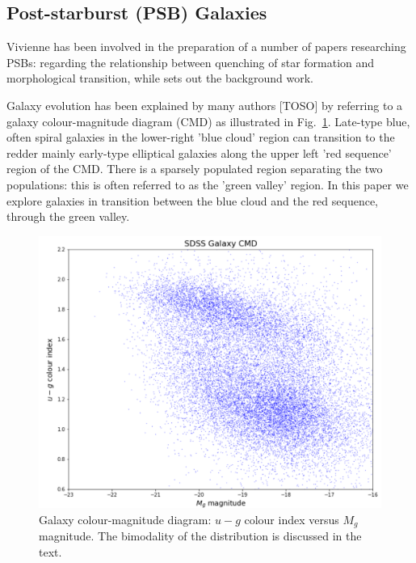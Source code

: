\subsection{Post-starburst (PSB) Galaxies}
\label{sec:PSBs}
Vivienne has been involved in the preparation of a number of papers researching PSBs: \citet{2017MNRAS.472.1401A} regarding the relationship between quenching of star formation and morphological transition, while \citet{2016MNRAS.463..832W} sets out the background work.
\par Galaxy evolution has been explained by many authors [TOSO] by referring to a galaxy colour-magnitude diagram (CMD) as illustrated in Fig.~\ref{fig:CMD1}. Late-type blue, often spiral galaxies in the lower-right 'blue cloud' region can transition to the redder mainly early-type elliptical galaxies along the upper left 'red sequence' region of the CMD. There is a sparsely populated region separating the two populations: this is often referred to as the 'green valley' region. In this paper we explore galaxies in transition between the blue cloud and the red sequence, through the green valley.

\begin{figure}
	\includegraphics[width=\columnwidth]{images/CMDs/galaxyCMD.PNG}
    \caption{Galaxy colour-magnitude diagram: $u-g$ colour index versus $M_g$ magnitude. The bimodality of the distribution is discussed in the text.}
    \label{fig:CMD1}
\end{figure}